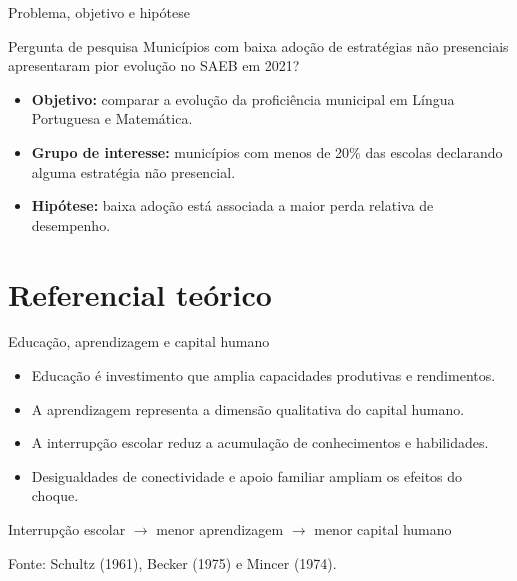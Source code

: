 \documentclass[aspectratio=169,11pt]{beamer}
\newcommand{\fonte}[1]{%
  \vfill
  {\raggedright\tiny\color{gray}Fonte: #1\par}
}
\begin{document}
\begin{frame}{Problema, objetivo e hipótese}
  \begin{block}{Pergunta de pesquisa}
    Municípios com baixa adoção de estratégias não presenciais apresentaram pior evolução no SAEB em 2021?
  \end{block}

  \begin{itemize}
    \item \textbf{Objetivo:} comparar a evolução da proficiência municipal em Língua Portuguesa e Matemática.
    \item \textbf{Grupo de interesse:} municípios com menos de 20\% das escolas declarando alguma estratégia não presencial.
    \item \textbf{Hipótese:} baixa adoção está associada a maior perda relativa de desempenho.
  \end{itemize}
\end{frame}

\section{Referencial teórico}

\begin{frame}{Educação, aprendizagem e capital humano}
  \begin{itemize}
    \item Educação é investimento que amplia capacidades produtivas e rendimentos.
    \item A aprendizagem representa a dimensão qualitativa do capital humano.
    \item A interrupção escolar reduz a acumulação de conhecimentos e habilidades.
    \item Desigualdades de conectividade e apoio familiar ampliam os efeitos do choque.
  \end{itemize}

  \vspace{0.8em}
  \begin{center}
    \large
    Interrupção escolar
    $\longrightarrow$ menor aprendizagem
    $\longrightarrow$ menor capital humano
  \end{center}

  \fonte{Schultz (1961), Becker (1975) e Mincer (1974).}
\end{frame}
\end{document}
